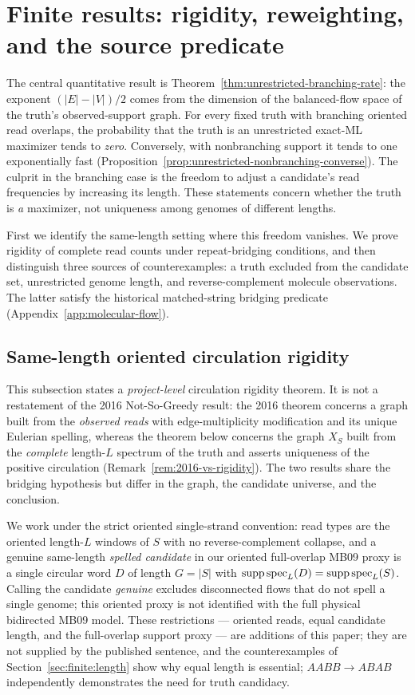\section{Finite results: rigidity, reweighting, and the source predicate}
\label{sec:finite}

The central quantitative result is
Theorem~\ref{thm:unrestricted-branching-rate}: the exponent
$(|E|-|V|)/2$ comes from the dimension of the balanced-flow
space of the truth's observed-support graph. For every fixed truth with branching oriented read overlaps,
the probability that the truth is an unrestricted exact-ML
maximizer tends to \emph{zero}. Conversely, with nonbranching
support it tends to one exponentially fast
(Proposition~\ref{prop:unrestricted-nonbranching-converse}).
The culprit in the branching case is the freedom to adjust
a candidate's read frequencies by increasing its length.
These statements concern whether the truth is \emph{a}
maximizer, not uniqueness among genomes of different lengths.

First we identify the same-length setting where this freedom
vanishes. We prove rigidity of complete read counts under
repeat-bridging conditions, and then distinguish three sources
of counterexamples: a truth excluded from the candidate set,
unrestricted genome length, and reverse-complement molecule
observations. The latter satisfy the historical matched-string
bridging predicate (Appendix~\ref{app:molecular-flow}).

\subsection{Same-length oriented circulation rigidity}

This subsection states a \emph{project-level} circulation rigidity theorem.
It is not a restatement of the 2016 Not-So-Greedy result: the 2016 theorem
concerns a graph built from the \emph{observed reads} with edge-multiplicity
modification and its unique Eulerian spelling, whereas the theorem below
concerns the graph $X_S$ built from the \emph{complete} length-$L$ spectrum of
the truth and asserts uniqueness of the positive circulation (Remark~\ref{rem:2016-vs-rigidity}).
The two results share the bridging hypothesis but differ in the graph, the
candidate universe, and the conclusion.

We work under the strict oriented single-strand convention: read types are the
oriented length-$L$ windows of $S$ with no reverse-complement collapse, and a
genuine same-length \emph{spelled candidate} in our oriented
full-overlap MB09 proxy is a single circular word $D$ of length
$G=|S|$ with $\operatorname{supp}\operatorname{spec}_L(D)=\operatorname{supp}\operatorname{spec}_L(S)$.
Calling the candidate \emph{genuine} excludes disconnected
flows that do not spell a single genome; this oriented proxy
is not identified with the full physical bidirected MB09 model. These restrictions ---
oriented reads, equal candidate length, and the full-overlap support proxy ---
are \projchoice{} additions of this paper; they are not supplied by the
published sentence, and the counterexamples of
Section~\ref{sec:finite:length} show why equal length is essential;
$AABB\to ABAB$ independently demonstrates the need for truth candidacy.

